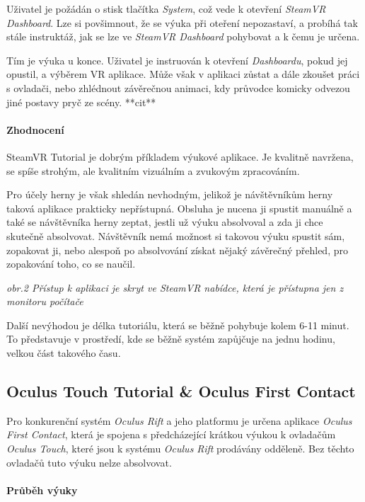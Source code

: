 Uživatel je požádán o stisk tlačítka \emph{System}, což vede k otevření
\emph{SteamVR Dashboard}. Lze si povšimnout, že se výuka při oteření
nepozastaví, a probíhá tak stále instruktáž, jak se lze ve \emph{SteamVR
Dashboard} pohybovat a k čemu je určena.

Tím je výuka u konce. Uživatel je instruován k otevření
\emph{Dashboardu}, pokud jej opustil, a výběrem VR aplikace. Může však v
aplikaci zůstat a dále zkoušet práci s ovladači, nebo zhlédnout
závěrečnou animaci, kdy průvodce komicky odvezou jiné postavy pryč ze
scény. **cit**

\paragraph{Zhodnocení}\label{zhodnocenuxed}

SteamVR Tutorial je dobrým příkladem výukové aplikace. Je kvalitně
navržena, se spíše strohým, ale kvalitním vizuálním a zvukovým
zpracováním.

Pro účely herny je však shledán nevhodným, jelikož je návštěvníkům herny
taková aplikace prakticky nepřístupná. Obsluha je nucena ji spustit
manuálně a také se návštěvníka herny zeptat, jestli už výuku absolvoval
a zda ji chce skutečně absolvovat. Návštěvník nemá možnost si takovou
výuku spustit sám, zopakovat ji, nebo alespoň po absolvování získat
nějaký závěrečný přehled, pro zopakování toho, co se naučil.


\emph{obr.2 Přístup k aplikaci je skryt ve SteamVR nabídce, která je
přístupna jen z monitoru počítače}

Další nevýhodou je délka tutoriálu, která se běžně pohybuje kolem 6-11
minut. To představuje v prostředí, kde se běžně systém zapůjčuje na
jednu hodinu, velkou část takového času.

\subsection{Oculus Touch Tutorial \& Oculus First
Contact}\label{oculus-touch-tutorial-oculus-first-contact}

Pro konkurenční systém \emph{Oculus Rift} a jeho platformu je určena
aplikace \emph{Oculus First Contact}, která je spojena s předcházející
krátkou výukou k ovladačům \emph{Oculus Touch}, které jsou k systému
\emph{Oculus Rift} prodávány odděleně. Bez těchto ovladačů tuto výuku
nelze absolvovat.

\paragraph{Průběh výuky}\label{prux16fbux11bh-vuxfduky-1}

